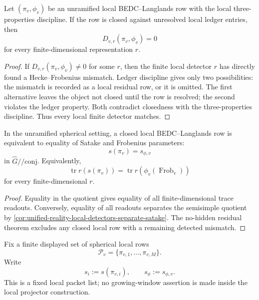 \begin{theorem}
\label{thm:unified-reality-unramified-local-no-hidden-residual}
Let $(\pi_v,\phi_v)$ be an unramified local BEDC--Langlands row with the
local three-properties discipline. If the row is closed against
unresolved local ledger entries, then
$$
D_{v,r}(\pi_v,\phi_v)=0
$$
for every finite-dimensional representation $r$.
\end{theorem}
\begin{proof}
If $D_{v,r}(\pi_v,\phi_v)\ne0$ for some $r$, then the finite local
detector $r$ has directly found a Hecke--Frobenius mismatch. Ledger
discipline gives only two possibilities: the mismatch is recorded as a
local residual row, or it is omitted. The first alternative leaves the
object not closed until the row is resolved; the second violates the
ledger property. Both contradict closedness with the three-properties
discipline. Thus every local finite detector matches.
\end{proof}

\begin{corollary}
\label{cor:unified-reality-unramified-local-langlands-closure}
In the unramified spherical setting, a closed local BEDC--Langlands row
is equivalent to equality of Satake and Frobenius parameters:
$$
s(\pi_v)=s_{\phi,v}
$$
in $\widehat G/\!/\mathrm{conj}$. Equivalently,
$$
\operatorname{tr}r(s(\pi_v))
=
\operatorname{tr}r(\phi_v(\operatorname{Frob}_v))
$$
for every finite-dimensional $r$.
\end{corollary}
\begin{proof}
Equality in the quotient gives equality of all finite-dimensional trace
readouts. Conversely, equality of all readouts separates the semisimple
quotient by
\autoref{cor:unified-reality-local-detectors-separate-satake}. The
no-hidden residual theorem excludes any closed local row with a
remaining detected mismatch.
\end{proof}

\begin{definition}
\label{def:unified-reality-local-finite-packet}
Fix a finite displayed set of spherical local rows
$$
\mathcal P_v=\{\pi_{v,1},\ldots,\pi_{v,M}\}.
$$
Write
$$
s_i:=s(\pi_{v,i}),
\qquad
s_{\phi}:=s_{\phi,v}.
$$
This is a fixed local packet list; no growing-window assertion is made
inside the local projector construction.
\end{definition}

